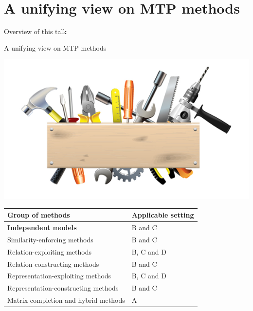 \documentclass[]{beamer}
\renewcommand{\alert}[1]{\textbf{\color{putblue} #1}}
\begin{document}
\section{A unifying view on MTP methods}


\begin{frame}{Overview of this talk}

\tableofcontents

\end{frame}

\begin{frame}{A unifying view on MTP methods}

\begin{center}
\includegraphics[scale=0.3]{pics/tools}

\begin{tabular}{ll}
\hline
Group of methods & Applicable setting \\
\hline
\hline
\alert{Independent models} & B and C \\
Similarity-enforcing methods & B and C   \\ 
Relation-exploiting methods & B, C and D  \\
Relation-constructing methods & B and C \\
Representation-exploiting methods & B, C and D \\
Representation-constructing methods & B and C \\
Matrix completion and hybrid methods & A \\
\hline  
\end{tabular}
\end{center}
\end{frame}
\end{document}
